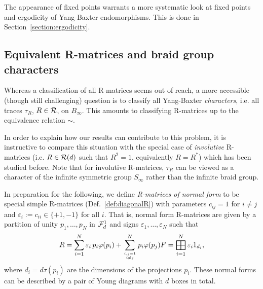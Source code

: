 \documentclass[12pt,a4paper]{amsart}
\numberwithin{equation}{section}
\theoremstyle{remark}
\newcommand{\eps}{\varepsilon}
\newcommand{\bigboxplus}{
  \mathop{
    \vphantom{\bigoplus} 
    \mathchoice
      {\vcenter{\hbox{\resizebox{\widthof{$\displaystyle\bigoplus$}}{!}{$\boxplus$}}}}
      {\vcenter{\hbox{\resizebox{\widthof{$\bigoplus$}}{!}{$\boxplus$}}}}
      {\vcenter{\hbox{\resizebox{\widthof{$\scriptstyle\oplus$}}{!}{$\boxplus$}}}}
      {\vcenter{\hbox{\resizebox{\widthof{$\scriptscriptstyle\oplus$}}{!}{$\boxplus$}}}}
  }\displaylimits 
}
\begin{document}
The appearance of fixed points warrants a more systematic look at fixed points and ergodicity of Yang-Baxter endomorphisms. This is done in Section~\ref{section:ergodicity}.



\subsection{Equivalent R-matrices and braid group characters}\label{subsection:EquivalencesAndPartialTraces}

Whereas a classification of all R-matrices seems out of reach, a more accessible (though still challenging) question is to classify all Yang-Baxter {\em characters}, i.e. all traces $\tau_R$, $R\in\mathcal{R}$, on $B_\infty$. This amounts to classifying R-matrices up to the equivalence relation $\sim$.

In order to explain how our results can contribute to this problem, it is instructive to compare this situation with the special case of {\em involutive} R-matrices (i.e. $R\in\mathcal{R}(d)$ such that $R^2=1$, equivalently $R=R^*$) which has been studied before. Note that for involutive R-matrices, $\tau_R$ can be viewed as a character of the infinite symmetric group $S_\infty$ rather than the infinite braid group.

In preparation for the following, we define {\em R-matrices of normal form} to be special simple R-matrices (Def.~\ref{def:diagonalR}) with parameters $c_{ij}=1$ for $i\neq j$ and $\eps_i:=c_{ii}\in\{+1,-1\}$ for all $i$. That is, normal form R-matrices are given by a partition of unity $p_1,\ldots,p_N$ in $\mathcal{F}_d^1$ and signs $\eps_1,\ldots,\eps_N$ such that
\begin{align}\label{eq:def-normal-form}
    R
    =
    \sum_{i=1}^N \eps_{i}\,p_i\varphi(p_i)+\sum_{\genfrac{}{}{0pt}{2}{i,j=1}{i\neq j}}^N p_i\varphi(p_j)F
    =
    \bigboxplus_{i=1}^N\eps_i 1_{d_i},
\end{align}
where $d_i=d\tau(p_i)$ are the dimensions of the projections $p_i$. These normal forms can be described by a pair of Young diagrams with $d$ boxes in total.
\end{document}
